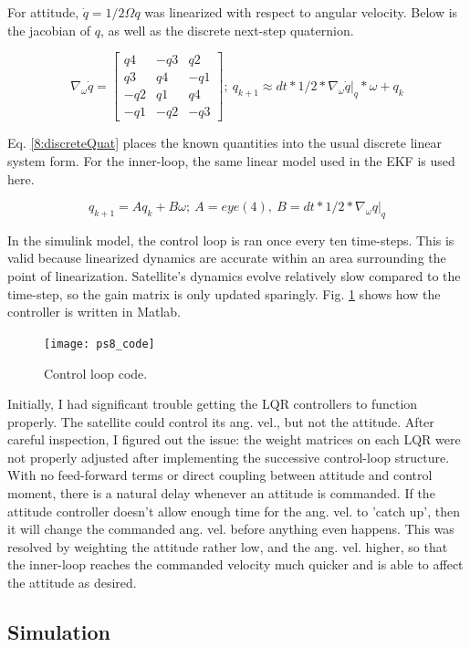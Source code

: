 \documentclass[12pt, letterpaper]{article}
\begin{document}
For attitude, $\dot{q} = 1/2\Omega q$ was linearized with respect to angular velocity. Below is the jacobian of $q$, as well as the discrete next-step quaternion.

\[
\nabla_\omega \dot{q} =
\begin{bmatrix}
q4 &-q3 &q2 \\
q3 &q4 &-q1 \\
-q2 &q1 &q4 \\
-q1 &-q2 &-q3
\end{bmatrix}
;\ q_{k+1} \approx dt*1/2*\nabla_\omega \dot{q}|_q*\omega + q_k
\]

Eq. \ref{8:discreteQuat} places the known quantities into the usual discrete linear system form. For the inner-loop, the same linear model used in the EKF is used here.

\begin{equation}
q_{k+1} = A q_k + B \omega;\ A = eye(4),\ B = dt*1/2*\nabla_\omega q|_q
\label{8:discreteQuat}
\end{equation}

In the simulink model, the control loop is ran once every ten time-steps. This is valid because linearized dynamics are accurate within an area surrounding the point of linearization. Satellite's dynamics evolve relatively slow compared to the time-step, so the gain matrix is only updated sparingly. Fig. \ref{8:code} shows how the controller is written in Matlab.


\begin{figure}[H]
	\centering
	\texttt{[image: ps8\_code]}
	\caption{Control loop code.}
	\label{8:code}
\end{figure}


Initially, I had significant trouble getting the LQR controllers to function properly. The satellite could control its ang. vel., but not the attitude. After careful inspection, I figured out the issue: the weight matrices on each LQR were not properly adjusted after implementing the successive control-loop structure. With no feed-forward terms or direct coupling between attitude and control moment, there is a natural delay whenever an attitude is commanded. If the attitude controller doesn't allow enough time for the ang. vel. to 'catch up', then it will change the commanded ang. vel. before anything even happens. This was resolved by weighting the attitude rather low, and the ang. vel. higher, so that the inner-loop reaches the commanded velocity much quicker and is able to affect the attitude as desired.


\subsection{Simulation}
\end{document}

